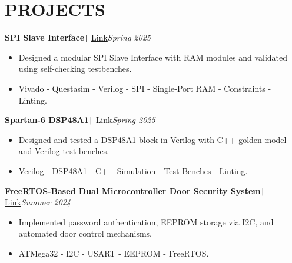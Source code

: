 \documentclass[11pt,a4paper]{article}
\begin{document}
\section*{\fontsize{14}{18}\textbf\selectfont PROJECTS}
\vspace{-0.3cm}
\begin{flushleft}
\textbf{SPI Slave Interface}\texttt{|} {\href{https://github.com/salah0eldin/Digital-Projects/tree/master/SPI_Slave_Interface}{Link}}\hfill\textit{Spring 2025}\\
\end{flushleft}
\vspace{-0.6cm}
\begin{itemize}
\item \setlength{\itemsep}{-0.0em} Designed a modular SPI Slave Interface with RAM modules and validated using self-checking testbenches.
\item \setlength{\itemsep}{-0.0em} Vivado - Questasim - Verilog - SPI - Single-Port RAM - Constraints - Linting.
\end{itemize}
\vspace{-0.3cm}
\begin{flushleft}
\textbf{Spartan-6 DSP48A1}\texttt{|} {\href{https://github.com/salah0eldin/Digital-Projects/tree/master/DSP48A1}{Link}}\hfill\textit{Spring 2025}\\
\end{flushleft}
\vspace{-0.6cm}
\begin{itemize}
\item \setlength{\itemsep}{-0.0em} Designed and tested a DSP48A1 block in Verilog with C++ golden model and Verilog test benches.
\item \setlength{\itemsep}{-0.0em} Verilog - DSP48A1 - C++ Simulation - Test Benches - Linting.
\end{itemize}
\vspace{-0.3cm}
\begin{flushleft}
\textbf{FreeRTOS-Based Dual Microcontroller Door Security System}\texttt{|} {\href{https://www.linkedin.com/feed/update/urn:li:activity:7261751302018244608/}{Link}}\hfill\textit{Summer 2024}\\
\end{flushleft}
\vspace{-0.6cm}
\begin{itemize}
\item \setlength{\itemsep}{-0.0em} Implemented password authentication, EEPROM storage via I2C, and automated door control mechanisms.
\item \setlength{\itemsep}{-0.0em} ATMega32 - I2C - USART - EEPROM - FreeRTOS.
\end{itemize}
\end{document}
